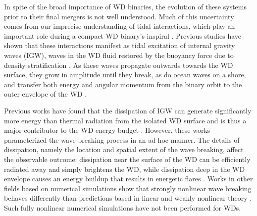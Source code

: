 \documentclass[
        fleqn,
        usenatbib,
    ]{mnras}
\begin{document}
In spite of the broad importance of WD binaries, the evolution of these systems
prior to their final mergers is not well understood. Much of this uncertainty
comes from our imprecise understanding of tidal interactions, which play an
important role during a compact WD binary's inspiral \citep{fullerII}. Previous
studies have shown that these interactions manifest as tidal excitation of
internal gravity waves (IGW), waves in the WD fluid restored by the buoyancy
force due to density stratification \citep{fullerI}. As these waves propagate
outwards towards the WD surface, they grow in amplitude until they break, as do
ocean waves on a shore, and transfer both energy and angular momentum from the
binary orbit to the outer envelope of the WD \citep{fullerI,fullerII}.

Previous works have found that the dissipation of IGW can generate significantly
more energy than thermal radiation from the isolated WD surface and is thus a
major contributor to the WD energy budget \citep{fullerII,fullerIV}. However,
these works parameterized the wave breaking process in an ad hoc manner. The
details of dissipation, namely the location and spatial extent of the wave
breaking, affect the observable outcome: dissipation near the surface of the WD
can be efficiently radiated away and simply brightens the WD, while dissipation
deep in the WD envelope causes an energy buildup that results in energetic
flares \citep{tidal_novae}. Works in other fields based on numerical simulations
show that strongly nonlinear wave breaking behaves differently than predictions
based in linear and weakly nonlinear theory \citep{winters1994,barker_ogilvie}.
Such fully nonlinear numerical simulations have not been performed for WDs.



\end{document}
